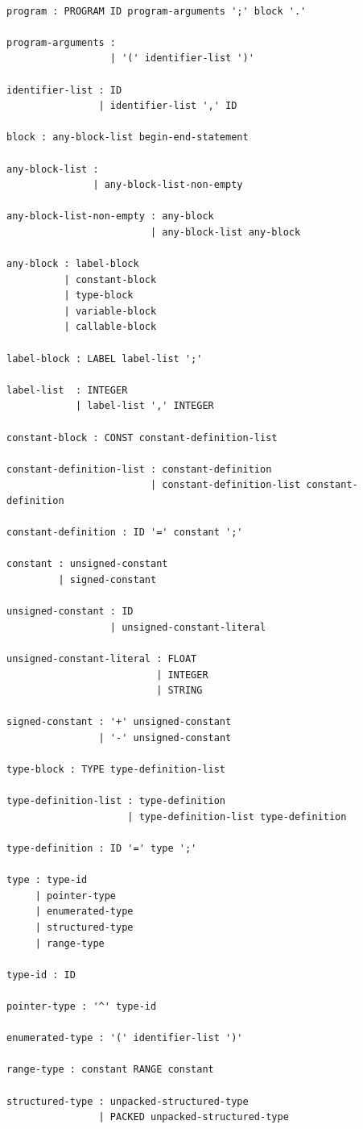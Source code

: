 \documentclass[12pt, a4paper]{article}
\begin{document}
\begin{lstlisting}

program : PROGRAM ID program-arguments ';' block '.'

program-arguments :
                  | '(' identifier-list ')'

identifier-list : ID
                | identifier-list ',' ID

block : any-block-list begin-end-statement

any-block-list :
               | any-block-list-non-empty

any-block-list-non-empty : any-block
                         | any-block-list any-block

any-block : label-block
          | constant-block
          | type-block
          | variable-block
          | callable-block

label-block : LABEL label-list ';'

label-list  : INTEGER
            | label-list ',' INTEGER

constant-block : CONST constant-definition-list

constant-definition-list : constant-definition
                         | constant-definition-list constant-definition

constant-definition : ID '=' constant ';'

constant : unsigned-constant
         | signed-constant

unsigned-constant : ID
                  | unsigned-constant-literal

unsigned-constant-literal : FLOAT
                          | INTEGER
                          | STRING

signed-constant : '+' unsigned-constant
                | '-' unsigned-constant

type-block : TYPE type-definition-list

type-definition-list : type-definition
                     | type-definition-list type-definition

type-definition : ID '=' type ';'

type : type-id
     | pointer-type
     | enumerated-type
     | structured-type
     | range-type

type-id : ID

pointer-type : '^' type-id

enumerated-type : '(' identifier-list ')'

range-type : constant RANGE constant

structured-type : unpacked-structured-type
                | PACKED unpacked-structured-type


\end{lstlisting}
\end{document}
